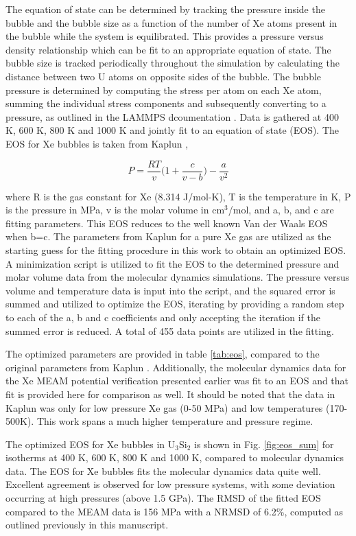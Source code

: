 \documentclass[review]{elsarticle}
\begin{document}
The equation of state can be determined by tracking the pressure inside the bubble and the bubble size as a function of the number of Xe atoms present in the bubble while the system is equilibrated. This provides a pressure versus density relationship which can be fit to an appropriate equation of state. The bubble size is tracked periodically throughout the simulation by calculating the distance between two U atoms on opposite sides of the bubble. The bubble pressure is determined by computing the stress per atom on each Xe atom, summing the individual stress components and subsequently converting to a pressure, as outlined in the LAMMPS dcoumentation \cite{plimpton1995}. Data is gathered at 400 K, 600 K, 800 K and 1000 K and jointly fit to an equation of state (EOS). The EOS for Xe bubbles is taken from Kaplun \cite{kaplun2003}, 

\begin{equation}
\label{eq:EOS}
P=\frac{RT}{v}\bigg( 1+\frac{c}{v-b}\bigg)-\frac{a}{v^2}
\end{equation}

where R is the gas constant for Xe (8.314 J/mol-K\cite{kaplun2003}), T is the temperature in K, P is the pressure in MPa, v is the molar volume in cm$^3$/mol, and a, b, and c are fitting parameters. This EOS reduces to the well known Van der Waals EOS when b=c. The parameters from Kaplun \cite{kaplun2003} for a pure Xe gas are utilized as the starting guess for the fitting procedure in this work to obtain an optimized EOS. A minimization script is utilized to fit the EOS to the determined pressure and molar volume data from the molecular dynamics simulations. The pressure versus volume and temperature data is input into the script, and the squared error is summed and utilized to optimize the EOS, iterating by providing a random step to each of the a, b and c coefficients and only accepting the iteration if the summed error is reduced. A total of 455 data points are utilized in the fitting. 

The optimized parameters are provided in table \ref{tab:eos}, compared to the original parameters from Kaplun \cite{kaplun2003}. Additionally, the molecular dynamics data for the Xe MEAM potential verification presented earlier was fit to an EOS and that fit is provided here for comparison as well. It should be noted that the data in Kaplun was only for low pressure Xe gas (0-50 MPa) and low temperatures (170-500K). This work spans a much higher temperature and pressure regime. 

The optimized EOS for Xe bubbles in U$_3$Si$_2$ is shown in Fig. \ref{fig:eos_sum} for isotherms at 400 K, 600 K, 800 K and 1000 K, compared to molecular dynamics data. The EOS for Xe bubbles fits the molecular dynamics data quite well. Excellent agreement is observed for low pressure systems, with some deviation occurring at high pressures (above 1.5 GPa). The RMSD of the fitted EOS compared to the MEAM data is 156 MPa with a NRMSD of 6.2\%, computed as outlined previously in this manuscript. 
\end{document}
